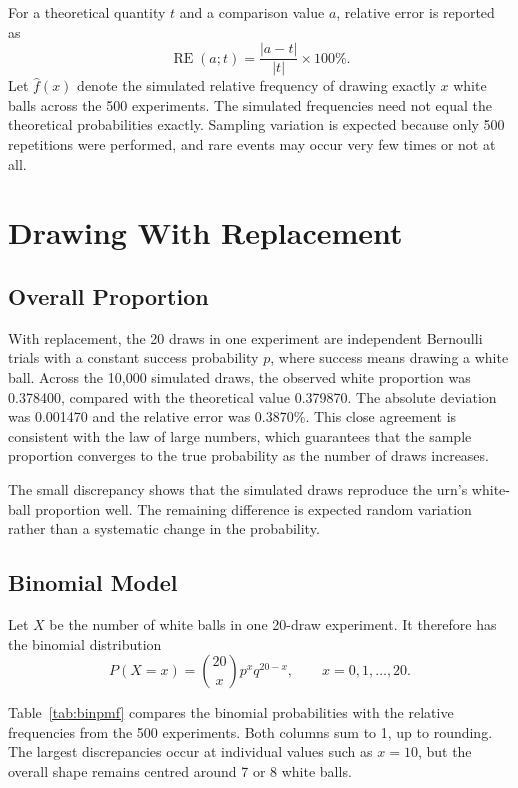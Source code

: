 \documentclass[12pt]{article}
\theoremstyle{definition}
\numberwithin{equation}{section}
\begin{document}
For a theoretical quantity \(t\) and a comparison value \(a\), relative error is reported as
\[
\operatorname{RE}(a;t)=\frac{|a-t|}{|t|}\times100\%.
\]
Let \(\hat{f}(x)\) denote the simulated relative frequency of drawing exactly \(x\) white balls across the 500 experiments. The simulated frequencies need not equal the theoretical probabilities exactly. Sampling variation is expected because only 500 repetitions were performed, and rare events may occur very few times or not at all.

\vfill\pagebreak
\section{Drawing With Replacement}

\subsection{Overall Proportion}

With replacement, the 20 draws in one experiment are independent Bernoulli trials with a constant success probability \(p\), where success means drawing a white ball.
Across the 10,000 simulated draws, the observed white proportion was 0.378400, compared with the theoretical value 0.379870. The absolute deviation was 0.001470 and the relative error was 0.3870\%.
This close agreement is consistent with the law of large numbers, which guarantees that the sample proportion converges to the true probability as the number of draws increases.

The small discrepancy shows that the simulated draws reproduce the urn's white-ball proportion well. The remaining difference is expected random variation rather than a systematic change in the probability.

\subsection{Binomial Model}

Let \(X\) be the number of white balls in one 20-draw experiment. It therefore has the binomial distribution
\[
P(X=x)=\binom{20}{x}p^xq^{20-x},\qquad x=0,1,\ldots,20.
\]

Table~\ref{tab:binpmf} compares the binomial probabilities with the relative frequencies from the 500 experiments. Both columns sum to 1, up to rounding. The largest discrepancies occur at individual values such as \(x=10\), but the overall shape remains centred around 7 or 8 white balls.
\end{document}
